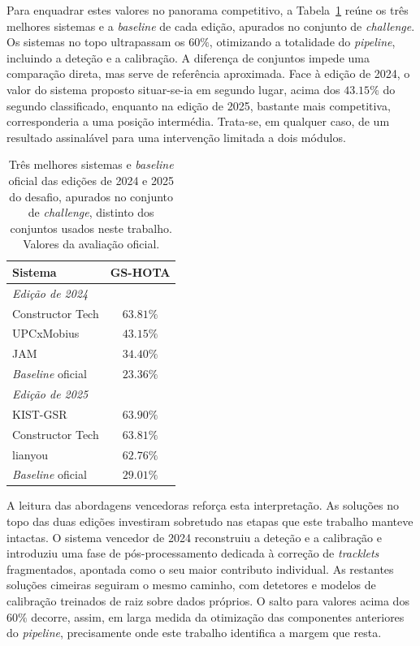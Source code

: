Para enquadrar estes valores no panorama competitivo, a Tabela~\ref{tab:leaderboard} reúne os três melhores sistemas e a \emph{baseline} de cada edição, apurados no conjunto de \emph{challenge}. Os sistemas no topo ultrapassam os $60\%$, otimizando a totalidade do \emph{pipeline}, incluindo a deteção e a calibração. A diferença de conjuntos impede uma comparação direta, mas serve de referência aproximada. Face à edição de 2024, o valor do sistema proposto situar-se-ia em segundo lugar, acima dos $43.15\%$ do segundo classificado, enquanto na edição de 2025, bastante mais competitiva, corresponderia a uma posição intermédia. Trata-se, em qualquer caso, de um resultado assinalável para uma intervenção limitada a dois módulos.

\begin{table}[htbp]
    \centering
    \caption{Três melhores sistemas e \emph{baseline} oficial das edições de 2024 e 2025 do desafio,
    apurados no conjunto de \emph{challenge}, distinto dos conjuntos usados neste trabalho.
    Valores da avaliação oficial.}
    \label{tab:leaderboard}
    \begin{tabular}{lc}
        \hline
        \textbf{Sistema} & \textbf{GS-HOTA} \\
        \hline
        \multicolumn{2}{l}{\emph{Edição de 2024}} \\
        Constructor Tech           & $63.81\%$ \\
        UPCxMobius                 & $43.15\%$ \\
        JAM                        & $34.40\%$ \\
        \emph{Baseline} oficial    & $23.36\%$ \\
        \hline
        \multicolumn{2}{l}{\emph{Edição de 2025}} \\
        KIST-GSR                   & $63.90\%$ \\
        Constructor Tech           & $63.81\%$ \\
        lianyou                    & $62.76\%$ \\
        \emph{Baseline} oficial    & $29.01\%$ \\
        \hline
    \end{tabular}
\end{table}

A leitura das abordagens vencedoras reforça esta interpretação. As soluções no topo das duas edições investiram sobretudo nas etapas que este trabalho manteve intactas. O sistema vencedor de 2024 reconstruiu a deteção e a calibração e introduziu uma fase de pós-processamento dedicada à correção de \emph{tracklets} fragmentados, apontada como o seu maior contributo individual. As restantes soluções cimeiras seguiram o mesmo caminho, com detetores e modelos de calibração treinados de raiz sobre dados próprios. O salto para valores acima dos $60\%$ decorre, assim, em larga medida da otimização das componentes anteriores do \emph{pipeline}, precisamente onde este trabalho identifica a margem que resta.

